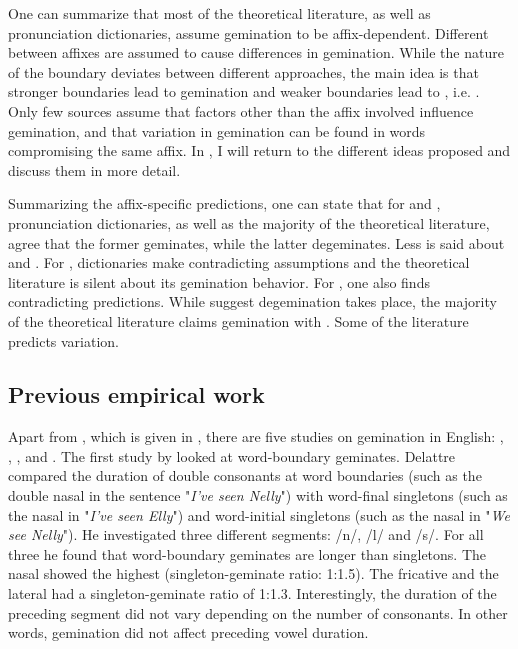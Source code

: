  
One can summarize that most of the theoretical literature, as well as pronunciation dictionaries, assume gemination to be affix-dependent. Different  between affixes are assumed to cause differences in gemination. While the nature of the boundary deviates between different approaches, the main idea is that stronger boundaries lead to gemination and weaker boundaries lead to , i.e. . Only few sources assume that factors other than the affix involved influence gemination, and that variation in gemination can be found in words compromising the same affix.  In , I will return to the different ideas proposed and discuss them in more detail. 

Summarizing the affix-specific predictions, one can state that for  and , pronunciation dictionaries, as well as the majority of the theoretical literature, agree that the former geminates, while the latter {degeminates}. Less is said about  and . For , dictionaries make contradicting assumptions and the theoretical literature is silent about its gemination behavior. For , one also finds contradicting predictions. While \cite{Wells.2008} suggest {degemination} takes place, the majority of the theoretical literature claims gemination with . Some of the literature predicts variation. 

\subsection{Previous empirical work}\label{previous empirical work}

Apart from \cite{BenHedia.2017}, which is given in , there are five studies on gemination in English: \cite{Delattre.}, \cite{Kaye.2005}, \cite{Oh.2012}, \cite{Oh.2013}   and \cite{Kotzor.2016}.   %
The first study by \cite{Delattre.} looked at word-boundary geminates. Delattre compared the duration of double consonants at word boundaries (such as the double nasal  in the sentence "\textit{I've seen Nelly}") with word-final singletons (such as the nasal in "\textit{I've seen Elly}") and word-initial singletons (such as the nasal in "\textit{We see Nelly}"). He investigated three different segments: /n/, /l/ and /s/. For all three he found that word-boundary geminates are longer than singletons. The nasal showed the highest  (singleton-geminate ratio: 1:1.5). The fricative and the lateral had a singleton-geminate ratio of 1:1.3. Interestingly, the duration of the preceding segment did not vary depending on the number of consonants. In other words, gemination did not affect preceding vowel duration.

